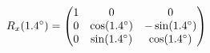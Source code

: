 \documentclass[preview]{standalone}
\begin{document}
\begin{align*}
\special{dvisvgm:raw <g id='unique000'>}R_x(1.4^\circ) = \begin{pmatrix} 1 & 0 & 0 \\ 0 & \cos(1.4^\circ) & -\sin(1.4^\circ) \\ 0 & \sin(1.4^\circ) & \cos(1.4^\circ) \end{pmatrix}\special{dvisvgm:raw </g>}
\end{align*}
\end{document}
